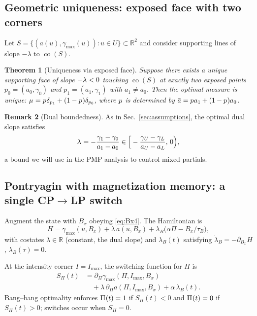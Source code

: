\documentclass[aps,pre,twocolumn,showpacs,superscriptaddress]{revtex4-2}
\newtheorem{theorem}{Theorem}
\theoremstyle{definition}
\newtheorem{remark}[theorem]{Remark}
\newcommand{\RR}{\mathbb{R}}
\begin{document}
\subsection{Geometric uniqueness: exposed face with two corners}\label{subsec:uniqueness4}

Let $S=\{(a(u),\gamma_{\max}(u)):u\in U\}\subset\RR^2$ and consider supporting lines of slope $-\lambda$ to $\operatorname{co}(S)$.

\begin{theorem}[Uniqueness via exposed face]\label{thm:geom-uniq-4}
Suppose there exists a unique supporting face of slope $-\lambda^{\*}<0$ touching $\operatorname{co}(S)$ at exactly two exposed points $p_0=(a_0,\gamma_0)$ and $p_1=(a_1,\gamma_1)$ with $a_1\neq a_0$. Then the optimal measure is unique: $\mu^{\*}=p^{\*}\delta_{p_1}+(1-p^{\*})\delta_{p_0}$, where $p^{\*}$ is determined by $\bar a=p^{\*} a_1+(1-p^{\*})a_0$.
\end{theorem}

\begin{remark}[Dual boundedness]\label{rem:dual-bdd}
As in Sec.~\ref{sec:assumptions}, the optimal dual slope satisfies
\begin{equation}\label{eq:lambda-bdd4}
\lambda^{\*}=-\frac{\gamma_1-\gamma_0}{a_1-a_0}\in \Big[-\frac{\gamma_U-\gamma_L}{a_U-a_L},\,0\Big),
\end{equation}
a bound we will use in the PMP analysis to control mixed partials.
\end{remark}

\subsection{Pontryagin with magnetization memory: a single CP\texorpdfstring{$\to$}{->}LP switch}\label{subsec:PMP4}

Augment the state with $B_x$ obeying \eqref{eq:Bx4}. The Hamiltonian is
\begin{equation}\label{eq:H4}
H=\gamma_{\max}(u,B_x)+\lambda\,a(u,B_x)+\lambda_B\big(\alpha \Pi - B_x/\tau_B\big),
\end{equation}
with costates $\lambda\in\RR$ (constant, the dual slope) and $\lambda_B(t)$ satisfying $\dot\lambda_B=-\partial_{B_x}H$, $\lambda_B(\tau)=0$.

At the intensity corner $I=I_{\max}$, the switching function for $\Pi$ is
\begin{align}\label{eq:Spi4}
S_\Pi(t) &=\partial_\Pi \gamma_{\max}(\Pi,I_{\max},B_x)\nonumber\\
&\quad + \lambda\,\partial_\Pi a(\Pi,I_{\max},B_x) + \alpha\,\lambda_B(t).
\end{align}
Bang–bang optimality enforces $\Pi^{\*}(t)=1$ if $S_\Pi(t)<0$ and $\Pi^{\*}(t)=0$ if $S_\Pi(t)>0$; switches occur when $S_\Pi=0$.
\end{document}
